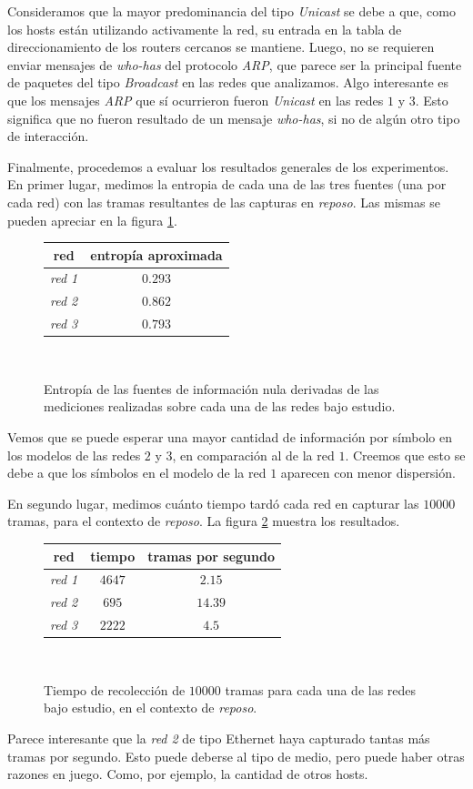 Consideramos que la mayor predominancia del tipo \textit{Unicast} se debe a que, como los hosts están utilizando activamente la red, su entrada en la tabla de direccionamiento de los routers cercanos se mantiene. Luego, no se requieren enviar mensajes de \textit{who-has} del protocolo \textit{ARP}, que parece ser la principal fuente de paquetes del tipo \textit{Broadcast} en las redes que analizamos. Algo interesante es que los mensajes \textit{ARP} que sí ocurrieron fueron \textit{Unicast} en las redes $1$ y $3$. Esto significa que no fueron resultado de un mensaje \textit{who-has}, si no de algún otro tipo de interacción.

\vspace{1em}
Finalmente, procedemos a evaluar los resultados generales de los experimentos. En primer lugar, medimos la entropia de cada una de las tres fuentes (una por cada red) con las tramas resultantes de las capturas en \textit{reposo}. Las mismas se pueden apreciar en la figura \ref{entropia}.

\vspace{1em}
\begin{figure}[!htbp]
    \begin{tabular}{ |c|c| } 
    \hline
    red & entropía aproximada \\
    \hline
    \textit{red 1} & $ 0.293$\\
    \textit{red 2} & $ 0.862$\\
    \textit{red 3} & $ 0.793$\\
    \hline
    \end{tabular} \\
    \bigskip
    \caption{Entropía de las fuentes de información nula derivadas de las mediciones realizadas sobre cada una de las redes bajo estudio.} \label{entropia}
\end{figure}

Vemos que se puede esperar una mayor cantidad de información por símbolo en los modelos de las redes $2$ y $3$, en comparación al de la red $1$. Creemos que esto se debe a que los símbolos en el modelo de la red $1$ aparecen con menor dispersión. 

\vspace{1em}
En segundo lugar, medimos cuánto tiempo tardó cada red en capturar las $10000$ tramas, para el contexto de \textit{reposo}. La figura \ref{tiempos} muestra los resultados.

\vspace{1em}
\begin{figure}[!htbp]
    \begin{tabular}{ |c|c|c| } 
    \hline
    red & tiempo & tramas por segundo \\
    \hline
    \textit{red 1} & $4647$ & $2.15$\\
    \textit{red 2} & $695$  & $14.39$\\
    \textit{red 3} & $2222$ & $4.5$\\
    \hline
    \end{tabular} \\
    \bigskip
    \caption{Tiempo de recolección de $10000$ tramas para cada una de las redes bajo estudio, en el contexto de \textit{reposo}.} \label{tiempos}
\end{figure}

Parece interesante que la \textit{red 2} de tipo Ethernet haya capturado tantas más tramas por segundo. Esto puede deberse al tipo de medio, pero puede haber otras razones en juego. Como, por ejemplo, la cantidad de otros hosts.
